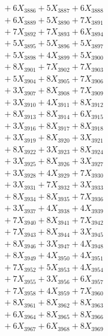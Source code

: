 \documentclass[a4paper,10pt]{article}
\begin{document}
{\begin{align}
&\;  + 6 X_{3886} + 5 X_{3887} + 6 X_{3888} \\[0.3ex]
&\;  + 6 X_{3889} + 5 X_{3890} + 7 X_{3891} \\[0.3ex]
&\;  + 7 X_{3892} + 7 X_{3893} + 6 X_{3894} \\[0.3ex]
&\;  + 5 X_{3895} + 5 X_{3896} + 5 X_{3897} \\[0.3ex]
&\;  + 5 X_{3898} + 4 X_{3899} + 5 X_{3900} \\[0.3ex]
&\;  + 8 X_{3901} + 7 X_{3902} + 7 X_{3903} \\[0.3ex]
&\;  + 5 X_{3904} + 8 X_{3905} + 7 X_{3906} \\[0.3ex]
&\;  + 3 X_{3907} + 8 X_{3908} + 7 X_{3909} \\[0.5ex]\allowbreak
&\;  + 3 X_{3910} + 4 X_{3911} + 8 X_{3912} \\[0.3ex]
&\;  + 8 X_{3913} + 8 X_{3914} + 6 X_{3915} \\[0.3ex]
&\;  + 3 X_{3916} + 8 X_{3917} + 8 X_{3918} \\[0.3ex]
&\;  + 3 X_{3919} + 8 X_{3920} + 3 X_{3921} \\[0.3ex]
&\;  + 8 X_{3922} + 3 X_{3923} + 8 X_{3924} \\[0.3ex]
&\;  + 3 X_{3925} + 8 X_{3926} + 3 X_{3927} \\[0.3ex]
&\;  + 3 X_{3928} + 4 X_{3929} + 7 X_{3930} \\[0.3ex]
&\;  + 3 X_{3931} + 7 X_{3932} + 3 X_{3933} \\[0.3ex]
&\;  + 8 X_{3934} + 8 X_{3935} + 7 X_{3936} \\[0.3ex]
&\;  + 3 X_{3937} + 4 X_{3938} + 4 X_{3939} \\[0.5ex]\allowbreak
&\;  + 7 X_{3940} + 8 X_{3941} + 7 X_{3942} \\[0.3ex]
&\;  + 7 X_{3943} + 8 X_{3944} + 3 X_{3945} \\[0.3ex]
&\;  + 8 X_{3946} + 3 X_{3947} + 4 X_{3948} \\[0.3ex]
&\;  + 8 X_{3949} + 4 X_{3950} + 4 X_{3951} \\[0.3ex]
&\;  + 7 X_{3952} + 5 X_{3953} + 4 X_{3954} \\[0.3ex]
&\;  + 7 X_{3955} + 3 X_{3956} + 6 X_{3957} \\[0.3ex]
&\;  + 7 X_{3958} + 4 X_{3959} + 7 X_{3960} \\[0.3ex]
&\;  + 8 X_{3961} + 8 X_{3962} + 8 X_{3963} \\[0.3ex]
&\;  + 6 X_{3964} + 8 X_{3965} + 8 X_{3966} \\[0.3ex]
&\;  + 6 X_{3967} + 6 X_{3968} + 8 X_{3969} \\[0.5ex]\allowbreak

\end{align}}
\end{document}
